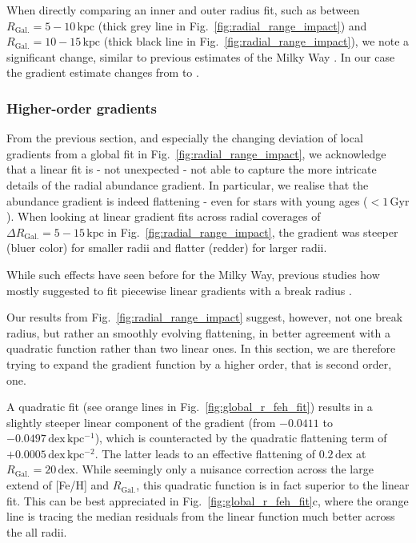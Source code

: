\documentclass[fleqn,usenatbib]{mnras}
\begin{document}
When directly comparing an inner and outer radius fit, such as between $R_\mathrm{Gal.} = 5-10\,\mathrm{kpc}$ (thick grey line in Fig.~\ref{fig:radial_range_impact}) and $R_\mathrm{Gal.} = 10-15\,\mathrm{kpc}$ (thick black line in Fig.~\ref{fig:radial_range_impact}), we note a significant change, similar to previous estimates of the Milky Way \citep[e.g.][]{Lemasle2008}. In our case the gradient estimate changes from  to .

\subsubsection{Higher-order gradients} \label{sec:non-linear_component}

From the previous section, and especially the changing deviation of local gradients from a global fit in Fig.~\ref{fig:radial_range_impact}, we acknowledge that a linear fit is - not unexpected - not able to capture the more intricate details of the radial abundance gradient. In particular, we realise that the abundance gradient is indeed flattening - even for stars with young ages ($< 1\,\mathrm{Gyr}$). When looking at linear gradient fits across radial coverages of  $\Delta R_\mathrm{Gal.} = 5-15\,\mathrm{kpc}$ in Fig.~\ref{fig:radial_range_impact}, the gradient was steeper (bluer color) for smaller radii and flatter (redder) for larger radii.

While such effects have seen before for the Milky Way, previous studies how mostly suggested to fit piecewise linear gradients with a break radius \citep[e.g.][]{Andrievsky2002, Boeche2013, Hayden2014, Anders2017, Donor2020}.

Our results from Fig.~\ref{fig:radial_range_impact} suggest, however, not one break radius, but rather an smoothly evolving flattening, in better agreement with a quadratic function rather than two linear ones. In this section, we are therefore trying to expand the gradient function by a higher order, that is second order, one.

A quadratic fit (see orange lines in Fig.~\ref{fig:global_r_feh_fit}) results in a slightly steeper linear component of the gradient (from $-0.0411$ to $-0.0497\,\mathrm{dex\,kpc^{-1}}$), which is counteracted by the quadratic flattening term of $+0.0005\,\mathrm{dex\,kpc^{-2}}$. The latter leads to an effective flattening of $0.2\,\mathrm{dex}$ at $R_\mathrm{Gal.} = 20\,\mathrm{dex}$. While seemingly only a nuisance correction across the large extend of [Fe/H] and $R_\mathrm{Gal.}$, this quadratic function is in fact superior to the linear fit. This can be best appreciated in Fig.~\ref{fig:global_r_feh_fit}c, where the orange line is tracing the median residuals from the linear function much better across the all radii.
\end{document}
